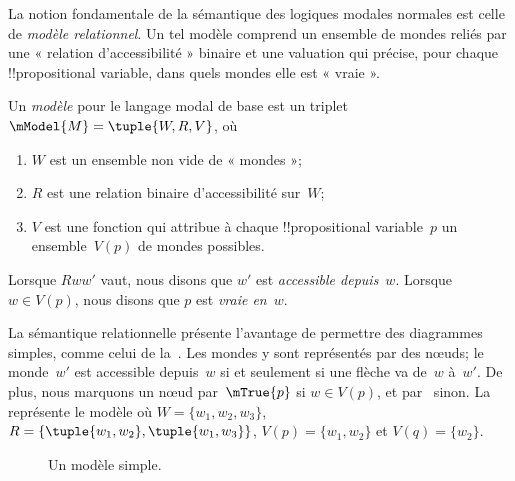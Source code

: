 \documentclass[../../../include/open-logic-section]{subfiles}
\begin{document}


La notion fondamentale de la sémantique des logiques modales normales
est celle de \emph{modèle relationnel}. Un tel modèle comprend un
ensemble de mondes reliés par une « relation d'accessibilité »
binaire et une valuation qui précise, pour chaque
!!{propositional variable}, dans quels mondes elle est « vraie ».

\begin{defn}
  Un \emph{modèle} pour le langage modal de base est un triplet
  $\mModel{M} = \tuple{W, R, V}$, où
  \begin{enumerate}
  \item $W$ est un ensemble non vide de « mondes »;
  \item $R$ est une relation binaire d'accessibilité sur~$W$;
  \item $V$ est une fonction qui attribue à chaque
    !!{propositional variable}~$p$ un ensemble~$V(p)$ de mondes
    possibles.
  \end{enumerate}
  Lorsque $Rww'$ vaut, nous disons que $w'$ est \emph{accessible
    depuis}~$w$. Lorsque $w \in V(p)$, nous disons que $p$ est
  \emph{vraie en}~$w$.
\end{defn}

La sémantique relationnelle présente l'avantage de permettre des
diagrammes simples, comme celui de la~. Les mondes y
sont représentés par des nœuds; le monde~$w'$ est accessible
depuis~$w$ si et seulement si une flèche va de~$w$ à~$w'$.
De plus, nous marquons un nœud par~$\mTrue{p}$ si $w \in V(p)$,
et par~ sinon. La  représente le modèle
où $W = \{w_1, w_2, w_3\}$, $R = \{\tuple{w_1, w_2},\tuple{w_1,
  w_3}\}$, $V(p) = \{w_1, w_2\}$ et $V(q) = \{w_2\}$.

\begin{figure}
  \begin{center}
  \end{center}
  \caption{Un modèle simple.}
\end{figure}
\end{document}
